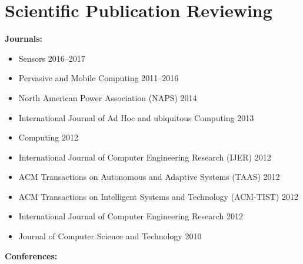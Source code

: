 \AOCLine
\section*{Scientific Publication Reviewing}
\label{sec:reviewing}

\textbf{Journals:}

\begin{itemize}
  \item{Sensors \hfill 2016--2017}
  \item{Pervasive and Mobile Computing \hfill 2011--2016}
  \item{North American Power Association (NAPS) \hfill 2014}
  \item{International Journal of Ad Hoc and ubiquitous Computing \hfill 2013}
  \item{Computing \hfill 2012}
  \item{International Journal of Computer Engineering Research (IJER) \hfill 2012}
	\item{ACM Transactions on Autonomous and Adaptive Systems (TAAS) \hfill 2012}
	\item{ACM Transactions on Intelligent Systems and Technology (ACM-TIST) \hfill 2012}
	\item{International Journal of Computer Engineering Research \hfill 2012}
	\item{Journal of Computer Science and Technology \hfill 2010}
\end{itemize}


\textbf{Conferences:}

